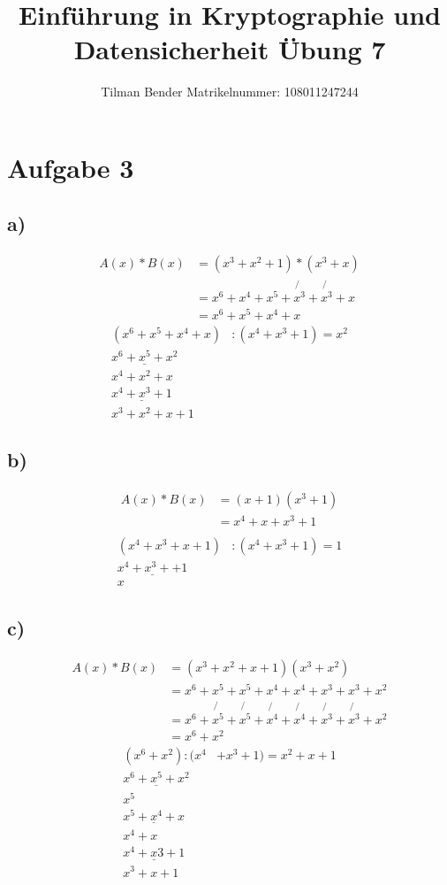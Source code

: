 \documentclass[10pt,a4paper]{article}
\author{Tilman Bender   Matrikelnummer: 108011247244\\}
\title{Einführung in Kryptographie und Datensicherheit Übung 7}
\begin{document}
\maketitle

\section*{Aufgabe 3}
\subsection*{a)}
\begin{align*}
A(x)*B(x) &= (x^{3}+x^{2}+1)*(x^{3}+x)\\
		&=x^{6}+x^{4}+x^{5}+\not{x^{3}}+\not{x^{3}}+x\\
		&=x^{6}+x^{5}+x^{4}+x
\end{align*}
\begin{align*}
(x^{6}+x^{5}+x^{4}+x)&:(x^{4}+x^{3}+1)=x^{2}\\
\underline{x^{6}+x^{5}+x^{2}}&\\
x^{4}+x^{2}+x\\
\underline{x^{4}+x^{3}+1}&\\
x^{3}+x^{2}+x+1&
\end{align*}
\subsection*{b)}
\begin{align*}
A(x)*B(x) &= (x+1)(x^{3}+1)\\
		&=x^{4}+x+x^{3}+1\\
\end{align*}
\begin{align*}
(x^{4}+x^{3}+x+1)&:(x^{4}+x^{3}+1)=1\\
\underline{x^{4}+x^{3}+   +1}&\\
x
\end{align*}

\subsection*{c)}
\begin{align*}
A(x)*B(x) &=(x^{3}+x^{2}+x+1)(x^{3}+x^{2})\\
		&=x^6+x^{5}+x^{5}+x^{4}+x^{4}+x^{3}+x^{3}+x^{2}\\
		&=x^6+\not{x^{5}}+\not{x^{5}}+\not{x^{4}}+\not{x^{4}}+\not{x^{3}}+\not{x^{3}}+x^{2}\\
		&=x^{6}+x^{2}
\end{align*}
\begin{align*}
(x^{6}+x^{2}):(x^{4}&+x^{3}+1)=x^{2}+x+1\\
\underline{x^{6}+x^{5}+x^{2}}&\\
x^{5}\\
\underline{x^{5}+x^{4}+x}\\
x^{4}+x\\
\underline{x^{4}+x{3}+1}\\
x^{3}+x+1\\
\end{align*}
\end{document}
